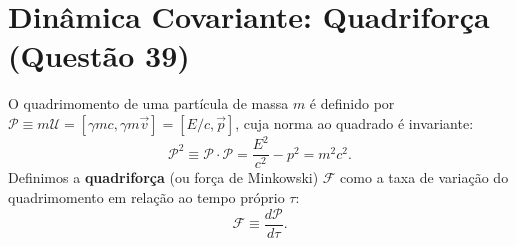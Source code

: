\documentclass[11pt, a4paper]{article}
\begin{document}
\section{Dinâmica Covariante: Quadriforça (Questão 39)}

O quadrimomento de uma partícula de massa $m$ é definido por $\mathcal{P} \equiv m \mathcal{U} = [\gamma m c, \gamma m \vec{v}] = [E/c, \vec{p}]$, cuja norma ao quadrado é invariante:
\begin{equation}
\mathcal{P}^2 \equiv \mathcal{P} \cdot \mathcal{P} = \frac{E^2}{c^2} - p^2 = m^2 c^2.
\end{equation}
Definimos a \textbf{quadriforça} (ou força de Minkowski) $\mathcal{F}$ como a taxa de variação do quadrimomento em relação ao tempo próprio $\tau$:
\begin{equation}
\mathcal{F} \equiv \frac{d\mathcal{P}}{d\tau}.
\end{equation}
\end{document}
